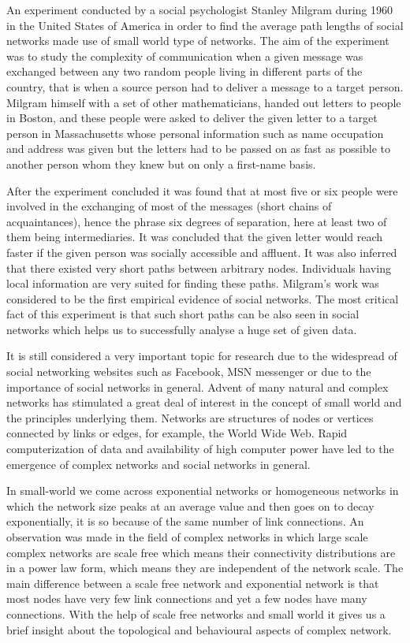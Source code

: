 
An experiment conducted by a social psychologist Stanley Milgram during 1960 in the United States of America in order to find the average path lengths of social networks made use of small world type of networks. The aim of the experiment was to study the complexity of communication when a given message was exchanged between any two random people living in different parts of the country, that is
when a source person had to deliver a message to a target person. Milgram himself with a set of other mathematicians, handed out letters to people in Boston, and these people were asked to deliver the given letter to a target person in Massachusetts whose personal information such as name occupation and address was given but the letters had to be passed on as fast as possible to another person whom they knew but on only a first-name basis. 

After the experiment concluded it was found that at most five or six people were involved in the exchanging of most of the messages (short chains of acquaintances), hence the phrase six degrees of separation, here at least two of them being intermediaries. It was concluded that the given letter would reach faster if the given person was socially accessible and affluent. It was also inferred that there existed very short paths between arbitrary nodes. Individuals having local information are very suited for finding these paths. Milgram’s work was considered to be the first empirical evidence of social networks. The most critical fact of this experiment is that such short paths can be also seen in social networks which helps us to successfully analyse a huge set of given data.

It is still considered a very important topic for research due to the widespread of social networking websites such as Facebook, MSN messenger or due to the importance of social networks in general. Advent of many natural and complex networks has stimulated a great deal of interest in the concept of small world and the principles underlying them. Networks are structures of nodes or vertices connected by links or edges, for example, the World Wide Web. Rapid computerization of data and availability of high computer power have led to the emergence of complex networks and social networks in general.

In small-world we come across exponential networks or homogeneous networks in which the network size peaks at an average value and then goes on to decay exponentially, it is so because of the same number of link connections. An observation was made in the field of complex networks in which large scale complex networks are scale free which means their connectivity distributions are in a power law form, which means they are independent of the network scale. The main difference between a scale free network and exponential network is that most nodes have very few link connections and yet a few nodes have many connections. With the help of scale free networks and small world it gives us a brief insight about the topological and behavioural aspects of complex network.  

